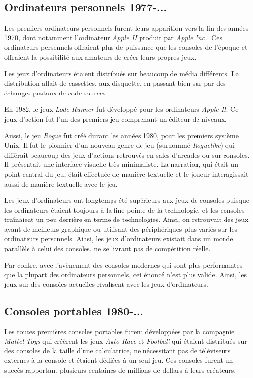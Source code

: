 \documentclass[12pt,oneside,letterpaper,francais]{book}
\begin{document}
\subsection{Ordinateurs personnels 1977-...}
Les premiers ordinateurs personnels furent leurs apparition vers la
fin des années 1970, dont notamment l'ordinateur \textit{Apple II}
produit par \textit{Apple Inc.}. Ces ordinateurs personnels offraient
plus de puissance que les consoles de l'époque et offraient la
possibilité aux amateurs de créer leurs propres jeux.

Les jeux d'ordinateurs étaient distribués sur beaucoup de média
différents. La distribution allait de cassettes, aux disquette, en
passant bien sur par des échanges postaux de code sources.

En 1982, le jeux \textit{Lode Runner} fut développé pour les
ordinateurs \textit{Apple II}. Ce jeux d'action fut l'un des premiers
jeu comprenant un éditeur de niveaux.

Aussi, le jeu \textit{Rogue} fut créé durant les années 1980, pour les
premiers système Unix. Il fut le pionnier d'un nouveau genre de jeu
(surnommé \textit{Roguelike}) qui différait beaucoup des jeux
d'actions retrouvés en sales d'arcades ou sur consoles. Il présentait
une interface visuelle très minimaliste. La narration, qui était un
point central du jeu, était effectuée de manière textuelle et le
joueur interagissait aussi de manière textuelle avec le jeu.

Les jeux d'ordinateurs ont longtemps été supérieurs aux jeux de
consoles puisque les ordinateurs étaient toujours à la fine pointe de
la technologie, et les consoles traînaient un peu derrière en terme de
technologies. Ainsi, on retrouvait des jeux ayant de meilleurs
graphique ou utilisant des périphériques plus variés sur les
ordinateurs personnels. Ainsi, les jeux d'ordinateurs existait dans un
monde parallèle à celui des consoles, ne se livrant pas de compétition
réelle.

Par contre, avec l'avènement des consoles modernes qui sont plus
performantes que la plupart des ordinateurs personnels, cet énoncé
n'est plus valide. Ainsi, les jeux sur des consoles actuelles
rivalisent avec les jeux d'ordinateurs.


\subsection{Consoles portables 1980-...}
Les toutes premières consoles portables furent développées par la
compagnie \textit{Mattel Toys} qui créèrent les jeux \textit{Auto
  Race} et \textit{Football} qui étaient distribués sur des consoles
de la taille d'une calculatrice, ne nécessitant pas de téléviseurs
externes à la console et étaient dédiées à un seul jeu. Ces consoles
furent un succès rapportant plusieurs centaines de millions de dollars
à leurs créateurs.
\end{document}
